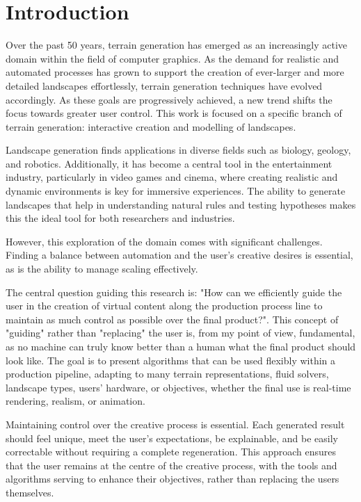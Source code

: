 \chapter{Introduction}
\label{chap:introduction}


Over the past 50 years, terrain generation has emerged as an increasingly active domain within the field of computer graphics. As the demand for realistic and automated processes has grown to support the creation of ever-larger and more detailed landscapes effortlessly, terrain generation techniques have evolved accordingly. As these goals are progressively achieved, a new trend shifts the focus towards greater user control. This work is focused on a specific branch of terrain generation: interactive creation and modelling of landscapes.

Landscape generation finds applications in diverse fields such as biology, geology, and robotics. Additionally, it has become a central tool in the entertainment industry, particularly in video games and cinema, where creating realistic and dynamic environments is key for immersive experiences. The ability to generate landscapes that help in understanding natural rules and testing hypotheses makes this the ideal tool for both researchers and industries.

However, this exploration of the domain comes with significant challenges. Finding a balance between automation and the user's creative desires is essential, as is the ability to manage scaling effectively.

The central question guiding this research is: "How can we efficiently guide the user in the creation of virtual content along the production process line to maintain as much control as possible over the final product?". This concept of "guiding" rather than "replacing" the user is, from my point of view, fundamental, as no machine can truly know better than a human what the final product should look like. The goal is to present algorithms that can be used flexibly within a production pipeline, adapting to many terrain representations, fluid solvers, landscape types, users' hardware, or objectives, whether the final use is real-time rendering, realism, or animation.

Maintaining control over the creative process is essential. Each generated result should feel unique, meet the user's expectations, be explainable, and be easily correctable without requiring a complete regeneration. This approach ensures that the user remains at the centre of the creative process, with the tools and algorithms serving to enhance their objectives, rather than replacing the users themselves.

